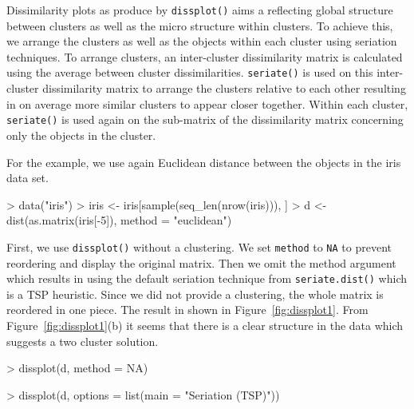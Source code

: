 \documentclass[fleqn, a4paper]{article}
\newcommand{\func}[1]{\mbox{\texttt{#1()}}}
\newcommand{\code}[1]{\mbox{\texttt{#1}}}
\begin{document}
Dissimilarity plots as produce by \func{dissplot} aims a reflecting
global structure between clusters as well as the micro structure within
clusters. To achieve this, we arrange the clusters as well as the
objects within each cluster using seriation techniques.  To arrange
clusters, an inter-cluster dissimilarity matrix is calculated using the
average between cluster dissimilarities. \func{seriate} is used on this
inter-cluster dissimilarity matrix to arrange the clusters relative to
each other resulting in on average more similar clusters to appear
closer together.  Within each cluster, \func{seriate} is used again on
the sub-matrix of the dissimilarity matrix concerning only the objects
in the cluster.

For the example, we use again Euclidean distance between the objects in the
iris data set.

\begin{Schunk}
\begin{Sinput}
> data("iris")
> iris <- iris[sample(seq_len(nrow(iris))), ]
> d <- dist(as.matrix(iris[-5]), method = "euclidean")
\end{Sinput}
\end{Schunk}

First, we use \func{dissplot} without a clustering. We set \code{method}
to \code{NA} to prevent reordering and display the original matrix. Then
we omit the method argument which results in using the default seriation
technique from \func{seriate.dist} which is a TSP heuristic. Since we did
not provide a clustering, the whole matrix is reordered in one piece.
The result in shown in Figure~\ref{fig:dissplot1}.
From Figure~\ref{fig:dissplot1}(b) it seems that there is a clear structure in
the data which suggests a two cluster solution.

\begin{Schunk}
\begin{Sinput}
> dissplot(d, method = NA)
\end{Sinput}
\end{Schunk}

\begin{Schunk}
\begin{Sinput}
> dissplot(d, options = list(main = "Seriation (TSP)"))
\end{Sinput}
\end{Schunk}
\end{document}
